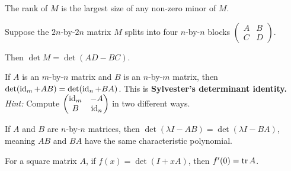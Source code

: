 \documentclass{homework}
\begin{document}
\begin{problem}
  The rank of $M$ is the largest size of any non-zero minor of $M$.
\end{problem}

\begin{problem}
  Suppose the $2n$-by-$2n$ matrix $M$ splits into four $n$-by-$n$ blocks $\begin{pmatrix} A & B \\ C & D \end{pmatrix}$.

  Then $\det M = \det (AD - BC)$.
\end{problem}

\begin{problem}\label{sylvesters-determinant}If $A$ is an
  $m$-by-$n$ matrix and $B$ is an $n$-by-$m$ matrix, then
  $\det(\operatorname{id}_{m}+AB)=\det(\operatorname{id}_{n}+BA)$.  This is \textbf{Sylvester's
    determinant identity.}  \textit{Hint:} Compute
  \( \begin{pmatrix}\operatorname{id}_{m}&-A\\B&\operatorname{id}_{n}\end{pmatrix} \) in two
  different ways.
\end{problem}

\begin{problem}
  If $A$ and $B$ are $n$-by-$n$ matrices, then
  $\det(\lambda I - AB) = \det(\lambda I - BA)$, meaning $AB$ and $BA$
  have the same characteristic polynomial.
\end{problem}

\begin{problem}
  For a square matrix $A$, if $f(x) = \det(I + xA)$, then $f'(0) = \operatorname{tr} A$.
\end{problem}
\end{document}

